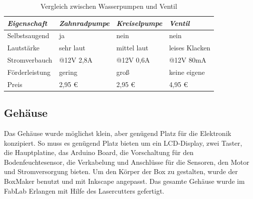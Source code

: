 \documentclass[]{IEEEtran}
\begin{document}
\begin{table}
	\centering
	\onehalfspacing
	
		\begin{tabular}{|l|lll|}
		\hline
		\textit{Eigenschaft} & \textit{Zahnradpumpe} & \textit{Kreiselpumpe} & \textit{Ventil} \\
		\hline
		Selbstsaugend	&ja	&nein &nein\\
		
		Lautstärke		&sehr laut	&mittel laut	&leises Klacken\\
		
		Stromverbauch	&@12V 2,8A	&@12V 0,6A	&@12V 80mA\\
		
		Förderleistung	&gering		&groß		&keine eigene\\
		
		Preis			&2,95 \euro	& 2,95 \euro	&	4,95 \euro\\
		\hline		
		\end{tabular}
	\caption{Vergleich zwischen Wasserpumpen und Ventil}
	\label{Vergleich zwischen Wasserpumpen und Ventil}

\end{table}	
	
	
	
	\subsection{Gehäuse}
	Das Gehäuse wurde möglichst klein, aber genügend Platz für die Elektronik konzipiert.
	So muss es genügend Platz bieten um ein LCD-Display, zwei Taster, die Hauptplatine, das Arduino Board,  die Vorschaltung für den Bodenfeuchtesensor, die Verkabelung und Anschlüsse für die Sensoren, den Motor und Stromversorgung  bieten.
	Um den Körper der Box zu gestalten, wurde der BoxMaker benutzt und mit Inkscape angepasst. 
	Das gesamte Gehäuse wurde im FabLab Erlangen mit Hilfe des Lasercutters gefertigt.
	
\end{document}
